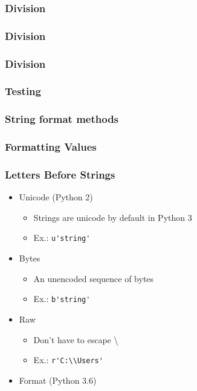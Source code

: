 \documentclass{beamer}
\begin{document}
%
%
\begin{frame}
  \frametitle{Division}
\end{frame}


%
%
\begin{frame}
  \frametitle{Division}
\end{frame}


%
%
\begin{frame}
  \frametitle{Division}
\end{frame}


%
%
\begin{frame}
  \frametitle{Testing}
\end{frame}


%
%
\begin{frame}
  \frametitle{String format methods}
\end{frame}


%
%
\begin{frame}
  \frametitle{Formatting Values} 
\end{frame}


%
%
\begin{frame}
  \frametitle{Letters Before Strings}
  \begin{itemize}
    \item Unicode (Python 2)
      \begin{itemize}
        \item Strings are unicode by default in Python 3
        \item Ex.: \lstinline{u'string'}
      \end{itemize}

    \item Bytes
      \begin{itemize}
        \item An unencoded sequence of bytes
        \item Ex.: \lstinline{b'string'}
      \end{itemize}

    \item Raw
      \begin{itemize}
	\item Don't have to escape \textbackslash
        \item Ex.: \lstinline{r'C:\\Users'}
      \end{itemize}

    \item Format (Python 3.6) 
    \end{itemize}
  \end{frame}
\end{document}
